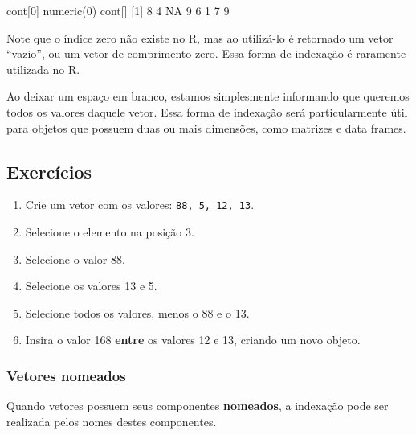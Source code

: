 \documentclass[
  10pt,
  a4paper]{book}
\newenvironment{Shaded}{\begin{snugshade}}{\end{snugshade}}
\newcommand{\ConstantTok}[1]{\textcolor[rgb]{0.00,0.00,0.00}{#1}}
\newcommand{\DecValTok}[1]{\textcolor[rgb]{0.00,0.00,0.81}{#1}}
\newcommand{\FunctionTok}[1]{\textcolor[rgb]{0.00,0.00,0.00}{#1}}
\newcommand{\NormalTok}[1]{#1}
\providecommand{\tightlist}{%
  \setlength{\itemsep}{0pt}\setlength{\parskip}{0pt}}
\begin{document}
\begin{Shaded}
\begin{Highlighting}[]
\NormalTok{cont[}\DecValTok{0}\NormalTok{]}
\FunctionTok{numeric}\NormalTok{(}\DecValTok{0}\NormalTok{)}
\NormalTok{cont[]}
\NormalTok{[}\DecValTok{1}\NormalTok{]  }\DecValTok{8}  \DecValTok{4} \ConstantTok{NA}  \DecValTok{9}  \DecValTok{6}  \DecValTok{1}  \DecValTok{7}  \DecValTok{9}
\end{Highlighting}
\end{Shaded}

Note que o índice zero não existe no R, mas ao utilizá-lo é retornado um
vetor ``vazio'', ou um vetor de comprimento zero. Essa forma de indexação
é raramente utilizada no R.

Ao deixar um espaço em branco, estamos simplesmente informando que
queremos todos os valores daquele vetor. Essa forma de indexação será
particularmente útil para objetos que possuem duas ou mais dimensões,
como matrizes e data frames.

\hypertarget{exercuxedcios-5}{%
\subsection*{Exercícios}\label{exercuxedcios-5}}


\begin{enumerate}
\def\labelenumi{\arabic{enumi}.}
\tightlist
\item
  Crie um vetor com os valores: \texttt{88,\ 5,\ 12,\ 13}.
\item
  Selecione o elemento na posição 3.
\item
  Selecione o valor 88.
\item
  Selecione os valores 13 e 5.
\item
  Selecione todos os valores, menos o 88 e o 13.
\item
  Insira o valor 168 \textbf{entre} os valores 12 e 13, criando um novo
  objeto.
\end{enumerate}

\hypertarget{vetores-nomeados}{%
\subsubsection{Vetores nomeados}\label{vetores-nomeados}}

Quando vetores possuem seus componentes \textbf{nomeados}, a indexação pode
ser realizada pelos nomes destes componentes.
\end{document}
